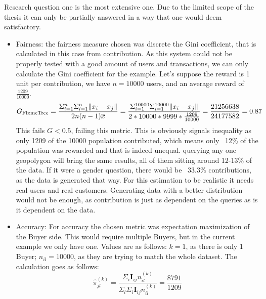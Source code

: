 \documentclass[english, 12pt, a4paper, sci, utf8, a-2b, online]{aaltothesis}
\theoremstyle{change}
\theoremstyle{theoremstyle}
\begin{document}
Research question one is the most extensive one. Due to the limited scope of the thesis it can only be partially answered in a way that one would deem satisfactory.
\begin{itemize}
    \item Fairness: the fairness measure chosen was discrete the Gini coefficient, that is calculated in this case from contribution. As this system could not be properly tested with a good amount of users and transactions, we can only calculate the Gini coefficient for the example. Let's suppose the reward is 1 unit per contribution, we have $n = 10000$ users, and an average reward of $\frac{1209}{10000}$.
    \begin{equation*}
        G_{\text{FixmeTree}}=\frac{\Sigma^{n}_{i=1}\Sigma^{n}_{i=1}\| x_i-x_j \|}{2n(n-1)\overline{x}} = \frac{\Sigma^{10000}_{i=1}\Sigma^{10000}_{i=1}\| x_i-x_j \|}{2*10000*9999*\frac{1209}{10000}}=\\
        \frac{21256638}{24177582} = 0.87
    \end{equation*}
    This fails $G < 0.5$, failing this metric.
    This is obviously signals inequality as only 1209 of the 10000 population contributed, which means only ~12\% of the population was rewarded and that is indeed unequal. querying any one geopolygon will bring the same results, all of them sitting around 12-13\% of the data. If it were a gender question, there would be ~33.3\% contributions, as the data is generated that way. For this estimation to be realistic it needs real users and real customers. Generating data with a better distribution would not be enough, as contribution is just as dependent on the queries as is it dependent on the data.
    \item Accuracy: For accuracy the chosen metric was expectation maximization of the Buyer side. This would require multiple Buyers, but in the current example we only have one. Values are as follows: $k=1$, as there is only 1 Buyer; $n_{il} = 10000$, as they are trying to match the whole dataset. The calculation goes as follows:
    \begin{equation*}
        \hat{\pi}^{(k)}_{jl} = \frac{\Sigma_i \mathbf{I}_{ij} n^{(k)}_{il}}{\Sigma_l \Sigma_i \mathbf{I}_{ij}n^{(k)}_{il}} = \frac{8791}{1209}
    \end{equation*}

\end{itemize}
\end{document}
